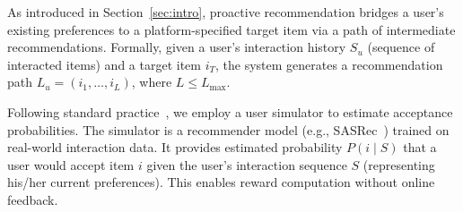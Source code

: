\documentclass{llmxive}
\begin{document}
As introduced in Section~\ref{sec:intro}, proactive recommendation bridges a user's existing preferences to a platform-specified target item via a path of intermediate recommendations. Formally, given a user's interaction history $S_u$ (sequence of interacted items) and a target item $i_T$, the system generates a recommendation path $L_u = (i_1, \ldots, i_L)$, where $L \leq L_{\max}$. 
 
Following standard practice~\cite{zhu2023influential,bi2024proactive}, we employ a user simulator to estimate acceptance probabilities. The simulator is a recommender model (e.g., SASRec~\cite{kang2018self}) trained on real-world interaction data. It provides estimated probability $P(i \mid S)$ that a user would accept item $i$ given the user's interaction sequence $S$ (representing his/her current preferences). This enables reward computation without online feedback.
\end{document}
